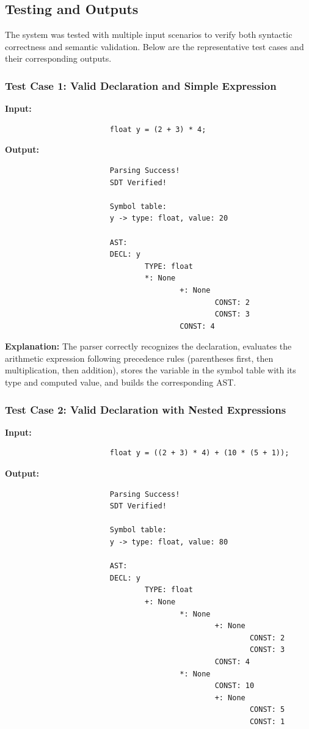 \documentclass[letterpaper,12pt,oneside]{article}
\begin{document}
\subsection{Testing and Outputs}

The system was tested with multiple input scenarios to verify both syntactic correctness and semantic validation. Below are the representative test cases and their corresponding outputs.

\subsubsection{Test Case 1: Valid Declaration and Simple Expression}

\textbf{Input:}
\begin{verbatim}
						float y = (2 + 3) * 4;
\end{verbatim}

\noindent\textbf{Output:}
\begin{verbatim}
						Parsing Success!
						SDT Verified!
						
						Symbol table:
						y -> type: float, value: 20
						
						AST:
						DECL: y
								TYPE: float
								*: None
										+: None
												CONST: 2
												CONST: 3
										CONST: 4
\end{verbatim}

\textbf{Explanation:} The parser correctly recognizes the declaration, evaluates the arithmetic expression following precedence rules (parentheses first, then multiplication, then addition), stores the variable in the symbol table with its type and computed value, and builds the corresponding AST.

\subsubsection{Test Case 2: Valid Declaration with Nested Expressions}

\textbf{Input:}
\begin{verbatim}
						float y = ((2 + 3) * 4) + (10 * (5 + 1));
\end{verbatim}

\noindent\textbf{Output:}
\begin{verbatim}
						Parsing Success!
						SDT Verified!
						
						Symbol table:
						y -> type: float, value: 80
						
						AST:
						DECL: y
								TYPE: float
								+: None
										*: None
												+: None
														CONST: 2
														CONST: 3
												CONST: 4
										*: None
												CONST: 10
												+: None
														CONST: 5
														CONST: 1
\end{verbatim}
\end{document}

